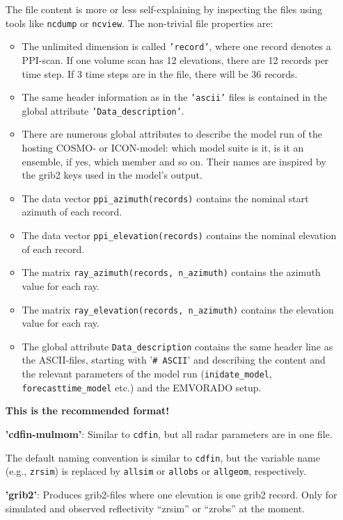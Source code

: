 \documentclass[10pt,a4paper,twoside,headinclude,footinclude,parskip=half]{scrartcl}
\newcommand{\srcform}[1]{\mbox{\texttt{#1}}\xspace}%
\begin{document}
\begin{itemize}
    The file content is more or less self-explaining by inspecting the files using tools like \srcform{ncdump} or \srcform{ncview}. The non-trivial file properties are:
    \begin{itemize}
    \item The unlimited dimension is called \srcform{'record'}, where one record denotes a PPI-scan. If one volume scan has 12 elevations, there are 12 records per time step. If 3 time steps are in the file, there will be 36 records.
    \item The same header information as in the \srcform{'ascii'} files is contained in the global attribute
      \srcform{'Data_description'}.
    \item There are numerous global attributes to describe the model run of the hosting COSMO- or ICON-model: which model suite is it, is it an ensemble, if yes, which member and so on. Their names are inspired by the grib2 keys used in the model's output.
    \item The data vector \srcform{ppi_azimuth(records)} contains the nominal start azimuth of each record.
    \item The data vector \srcform{ppi_elevation(records)} contains the nominal elevation of each record.
    \item The matrix \srcform{ray_azimuth(records, n_azimuth)} contains the azimuth value for each ray.
    \item The matrix \srcform{ray_elevation(records, n_azimuth)} contains the elevation value for each ray.
    \item The global attribute \srcform{Data_description} contains the same header line as the ASCII-files,
      starting with '\srcform{\# ASCII}' and describing the content and the relevant parameters of the model
      run (\srcform{inidate_model}, \srcform{forecasttime_model} etc.) and the EMVORADO setup.
    \end{itemize}
    \textbf{This is the recommended format!}
  \item[\textbf{'cdfin-mulmom'}:] Similar to \srcform{cdfin}, but all radar parameters are in one file.

    The default naming convention is similar to \srcform{cdfin}, but the variable name (e.g., \verb|zrsim|) is replaced by \verb|allsim| or \verb|allobs| or \verb|allgeom|, respectively.
  \item[\textbf{'grib2'}:] Produces grib2-files where one elevation is one grib2 record. Only for simulated and observed reflectivity ``zrsim'' or ``zrobs'' at the moment.


\end{itemize}
\end{document}
